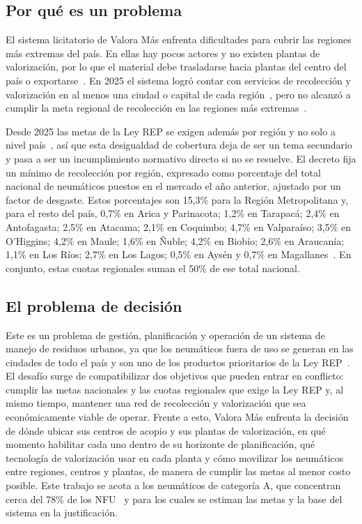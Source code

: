\documentclass[letterpaper]{article}
\begin{document}
\subsection*{Por qué es un problema}

El sistema licitatorio de Valora Más enfrenta dificultades para cubrir las regiones más extremas del país. En ellas hay pocos actores y no existen plantas de valorización, por lo que el material debe trasladarse hacia plantas del centro del país o exportarse~\cite{paiscircular2026}. En 2025 el sistema logró contar con servicios de recolección y valorización en al menos una ciudad o capital de cada región~\cite{paiscircular2025}, pero no alcanzó a cumplir la meta regional de recolección en las regiones más extremas~\cite{paiscircular2026}.

Desde 2025 las metas de la Ley REP se exigen además por región y no solo a nivel país~\cite{DS8}, así que esta desigualdad de cobertura deja de ser un tema secundario y pasa a ser un incumplimiento normativo directo si no se resuelve. El decreto fija un mínimo de recolección por región, expresado como porcentaje del total nacional de neumáticos puestos en el mercado el año anterior, ajustado por un factor de desgaste. Estos porcentajes son 15,3\% para la Región Metropolitana y, para el resto del país, 0,7\% en Arica y Parinacota; 1,2\% en Tarapacá; 2,4\% en Antofagasta; 2,5\% en Atacama; 2,1\% en Coquimbo; 4,7\% en Valparaíso; 3,5\% en O'Higgins; 4,2\% en Maule; 1,6\% en Ñuble; 4,2\% en Biobío; 2,6\% en Araucanía; 1,1\% en Los Ríos; 2,7\% en Los Lagos; 0,5\% en Aysén y 0,7\% en Magallanes~\cite{DS8}. En conjunto, estas cuotas regionales suman el 50\% de ese total nacional.

\subsection*{El problema de decisión}

Este es un problema de gestión, planificación y operación de un sistema de manejo de residuos urbanos, ya que los neumáticos fuera de uso se generan en las ciudades de todo el país y son uno de los productos prioritarios de la Ley REP~\cite{leyrep20920}. El desafío surge de compatibilizar dos objetivos que pueden entrar en conflicto: cumplir las metas nacionales y las cuotas regionales que exige la Ley REP y, al mismo tiempo, mantener una red de recolección y valorización que sea económicamente viable de operar. Frente a esto, Valora Más enfrenta la decisión de dónde ubicar sus centros de acopio y sus plantas de valorización, en qué momento habilitar cada uno dentro de su horizonte de planificación, qué tecnología de valorización usar en cada planta y cómo movilizar los neumáticos entre regiones, centros y plantas, de manera de cumplir las metas al menor costo posible. Este trabajo se acota a los neumáticos de categoría A, que concentran cerca del 78\% de los NFU~\cite{kyklos2026} y para los cuales se estiman las metas y la base del sistema en la justificación.
\end{document}
